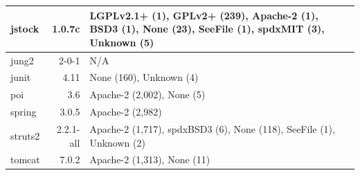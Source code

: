 \documentclass[sigconf,review, anonymous]{acmart}
\begin{document}
\begin{table}
\begin{tabular}{l|r|p{4cm}}
		jstock & 1.0.7c & LGPLv2.1+ (1), \newline GPLv2+ (239), \newline Apache-2 (1), BSD3 (1), \newline None (23), SeeFile (1), \newline spdxMIT (3), Unknown (5)\\
		\hline
		jung2 & 2-0-1 & N/A \\
		\hline
		junit & 4.11 & None (160), Unknown (4)  \\
		\hline
		poi & 3.6 & Apache-2 (2,002), None (5) \\
		\hline
		spring & 3.0.5 & Apache-2 (2,982) \\
		\hline
		struts2 & 2.2.1-all & Apache-2 (1,717), \newline spdxBSD3 (6), \newline None (118), SeeFile (1), \newline Unknown (2) \\
		\hline
		tomcat & 7.0.2 & Apache-2 (1,313), None (11) \\
		\hline
	\end{tabular} %
\end{table}
\end{document}
